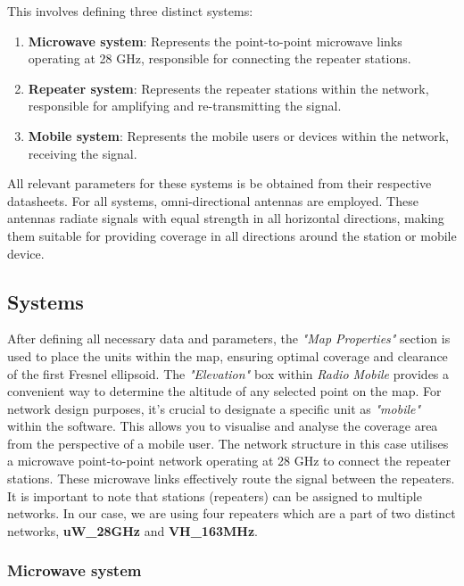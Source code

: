\vspace{5mm}
This involves defining three distinct systems:
\begin{enumerate}
    \item \textbf{Microwave system}: Represents the point-to-point microwave links operating at 28 GHz, responsible for connecting the repeater stations.
    \item \textbf{Repeater system}: Represents the repeater stations within the network, responsible for amplifying and re-transmitting the signal.
    \item \textbf{Mobile system}: Represents the mobile users or devices within the network, receiving the signal.
\end{enumerate}
All relevant parameters for these systems is be obtained from their respective datasheets.
For all systems, omni-directional antennas are employed.
These antennas radiate signals with equal strength in all horizontal directions, making them suitable for providing coverage in all directions around the station or mobile device.

\subsection{Systems}
After defining all necessary data and parameters, the \textit{"Map Properties"} section is used to place the units within the map, ensuring optimal coverage and clearance of the first Fresnel ellipsoid.
The \textit{"Elevation"} box within \textit{Radio Mobile} provides a convenient way to determine the altitude of any selected point on the map.
For network design purposes, it's crucial to designate a specific unit as \textit{"mobile"} within the software.
This allows you to visualise and analyse the coverage area from the perspective of a mobile user.
The network structure in this case utilises a microwave point-to-point network operating at 28 GHz to connect the repeater stations.
These microwave links effectively route the signal between the repeaters.
It is important to note that stations (repeaters) can be assigned to multiple networks.
In our case, we are using four repeaters which are a part of two distinct networks, \textbf{uW\_28GHz} and \textbf{VH\_163MHz}.

\subsubsection{Microwave system}

